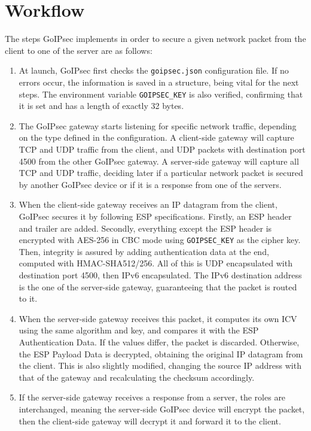 \documentclass[a4paper,12pt]{report}
\begin{document}
		\section{Workflow}
		The steps GoIPsec implements in order to secure a given network packet from the client to one of the server are as follows:
		\begin{enumerate}
		\item At launch, GoIPsec first checks the \texttt{goipsec.json} configuration file. If no errors occur, the information is saved in a structure, being vital for the next steps. The environment variable \texttt{GOIPSEC\_KEY} is also verified, confirming that it is set and has a length of exactly 32 bytes.
		\item The GoIPsec gateway starts listening for specific network traffic, depending on the type defined in the configuration. A client-side gateway will capture TCP and UDP traffic from the client, and UDP packets with destination port 4500 from the other GoIPsec gateway. A server-side gateway will capture all TCP and UDP traffic, deciding later if a particular network packet is secured by another GoIPsec device or if it is a response from one of the servers.
		\item When the client-side gateway receives an IP datagram from the client, GoIPsec secures it by following ESP specifications. Firstly, an ESP header and trailer are added. Secondly, everything except the ESP header is encrypted with AES-256 in CBC mode using \texttt{GOIPSEC\_KEY} as the cipher key. Then, integrity is assured by adding authentication data at the end, computed with HMAC-SHA512/256. All of this is UDP encapsulated with destination port 4500, then IPv6 encapsulated. The IPv6 destination address is the one of the server-side gateway, guaranteeing that the packet is routed to it.
		\item When the server-side gateway receives this packet, it computes its own ICV using the same algorithm and key, and compares it with the ESP Authentication Data. If the values differ, the packet is discarded. Otherwise, the ESP Payload Data is decrypted, obtaining the original IP datagram from the client. This is also slightly modified, changing the source IP address with that of the gateway and recalculating the checksum accordingly.
		\item If the server-side gateway receives a response from a server, the roles are interchanged, meaning the server-side GoIPsec device will encrypt the packet, then the client-side gateway will decrypt it and forward it to the client.
		\end{enumerate}
		
\end{document}
